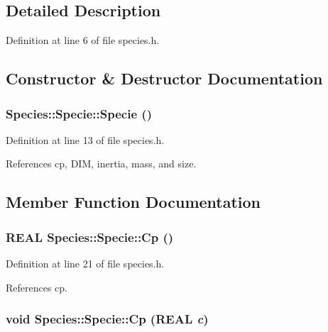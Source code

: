 \subsection{Detailed Description}


Definition at line 6 of file species.h.

\subsection{Constructor \& Destructor Documentation}
\hypertarget{classSpecies_1_1Specie_e2b5a8c985b384598136351ab61f30b6}{
\subsubsection[{Specie}]{\setlength{\rightskip}{0pt plus 5cm}Species::Specie::Specie ()}}
\label{classSpecies_1_1Specie_e2b5a8c985b384598136351ab61f30b6}




Definition at line 13 of file species.h.

References cp, DIM, inertia, mass, and size.

\subsection{Member Function Documentation}
\hypertarget{classSpecies_1_1Specie_0d3ec9a1b51decff3b4725892447d222}{
\subsubsection[{Cp}]{\setlength{\rightskip}{0pt plus 5cm}REAL Species::Specie::Cp ()}}
\label{classSpecies_1_1Specie_0d3ec9a1b51decff3b4725892447d222}




Definition at line 21 of file species.h.

References cp.\hypertarget{classSpecies_1_1Specie_64b0bc8ca78c0f32a731a954003318d5}{
\subsubsection[{Cp}]{\setlength{\rightskip}{0pt plus 5cm}void Species::Specie::Cp (REAL {\em c})}}
\label{classSpecies_1_1Specie_64b0bc8ca78c0f32a731a954003318d5}





